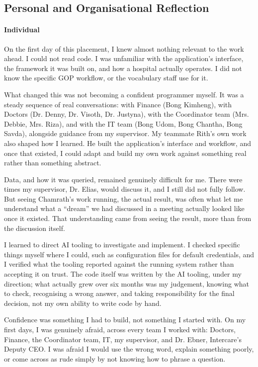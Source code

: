 \subsection{Personal and Organisational Reflection}
\label{sec:conc-reflection}

\paragraph{Individual}

On the first day of this placement, I knew almost nothing relevant to the work ahead. I could not read code. I was unfamiliar with the application's interface, the framework it was built on, and how a hospital actually operates. I did not know the specific GOP workflow, or the vocabulary staff use for it.

What changed this was not becoming a confident programmer myself. It was a steady sequence of real conversations: with Finance (Bong Kimheng), with Doctors (Dr. Denny, Dr. Visoth, Dr. Justyna), with the Coordinator team (Mrs. Debbie, Mrs. Riza), and with the IT team (Bong Udom, Bong Chantha, Bong Savda), alongside guidance from my supervisor. My teammate Rith's own work also shaped how I learned. He built the application's interface and workflow, and once that existed, I could adapt and build my own work against something real rather than something abstract.

Data, and how it was queried, remained genuinely difficult for me. There were times my supervisor, Dr. Elias, would discuss it, and I still did not fully follow. But seeing Chamrath's work running, the actual result, was often what let me understand what a ``dream'' we had discussed in a meeting actually looked like once it existed. That understanding came from seeing the result, more than from the discussion itself.

I learned to direct AI tooling to investigate and implement. I checked specific things myself where I could, such as configuration files for default credentials, and I verified what the tooling reported against the running system rather than accepting it on trust. The code itself was written by the AI tooling, under my direction; what actually grew over six months was my judgement, knowing what to check, recognising a wrong answer, and taking responsibility for the final decision, not my own ability to write code by hand.

Confidence was something I had to build, not something I started with. On my first days, I was genuinely afraid, across every team I worked with: Doctors, Finance, the Coordinator team, IT, my supervisor, and Dr. Ebner, Intercare's Deputy CEO. I was afraid I would use the wrong word, explain something poorly, or come across as rude simply by not knowing how to phrase a question.

